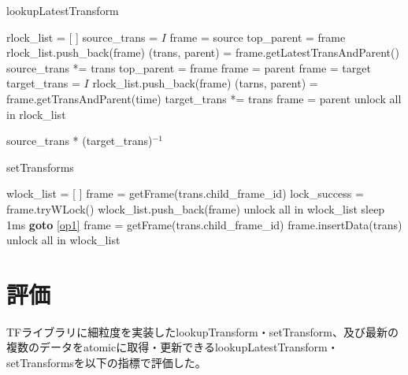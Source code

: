 \documentclass[a4paper]{jreport}	%
\begin{document}
\begin{algorithm}
  \caption{lookupLatestTransform}\label{algo:lookupLatestTransform}
\begin{algorithmic}[1]
	\State rlock\_list = [ ]
	\State source\_trans = $I$
	\State frame = source
	\State top\_parent = frame
	\State rlock\_list.push\_back(frame)
	\State (trans, parent) = frame.getLatestTransAndParent() 
	\State source\_trans *= trans
	\State top\_parent = frame
	\State frame = parent
	\EndWhile
	\State frame = target
	\State target\_trans = $I$
	\State rlock\_list.push\_back(frame)
	\State (tarns, parent) = frame.getTransAndParent(time)
	\State target\_trans *= trans
	\State frame = parent
	\EndWhile
	\State unlock all in rlock\_list
	
	\Return source\_trans * (target\_trans)$^{-1}$
	\EndFunction
\end{algorithmic}
\end{algorithm}


\begin{algorithm}
\caption{setTransforms}\label{algo:setTransforms}
\begin{algorithmic}[1]
	\State wlock\_list = [ ] \label{op1}
	\State frame = getFrame(trans.child\_frame\_id)
	\State lock\_success = frame.tryWLock()
	\State wlock\_list.push\_back(frame)
	\Else
	\State unlock all in wlock\_list
	\State sleep 1ms 
	\State \textbf{goto} \ref{op1}
	\EndIf
	\EndFor
	 
	\State frame = getFrame(trans.child\_frame\_id)
	\State frame.insertData(trans)
	\EndFor
	\State unlock all in wlock\_list
	\EndFunction
\end{algorithmic}
\end{algorithm}

\chapter{評価}
TFライブラリに細粒度を実装したlookupTransform・setTransform、及び最新の複数のデータをatomicに取得・更新できるlookupLatestTransform・setTransformsを以下の指標で評価した。
\end{document}
